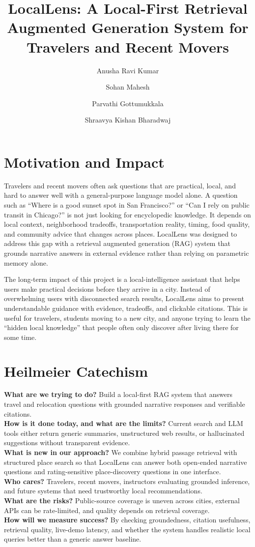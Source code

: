 \documentclass[11pt]{article}
\title{LocalLens: A Local-First Retrieval Augmented Generation System for Travelers and Recent Movers}
\author{
Anusha Ravi Kumar \and
Sohan Mahesh \and
Parvathi Gottumukkala \and
Shraavya Kishan Bharadwaj
}
\date{}
\begin{document}
\maketitle

\section{Motivation and Impact}
Travelers and recent movers often ask questions that are practical, local, and hard to answer well with a general-purpose language model alone. A question such as ``Where is a good sunset spot in San Francisco?'' or ``Can I rely on public transit in Chicago?'' is not just looking for encyclopedic knowledge. It depends on local context, neighborhood tradeoffs, transportation reality, timing, food quality, and community advice that changes across places. LocalLens was designed to address this gap with a retrieval augmented generation (RAG) system that grounds narrative answers in external evidence rather than relying on parametric memory alone.

The long-term impact of this project is a local-intelligence assistant that helps users make practical decisions before they arrive in a city. Instead of overwhelming users with disconnected search results, LocalLens aims to present understandable guidance with evidence, tradeoffs, and clickable citations. This is useful for travelers, students moving to a new city, and anyone trying to learn the ``hidden local knowledge'' that people often only discover after living there for some time.

\section{Heilmeier Catechism}
\textbf{What are we trying to do?} Build a local-first RAG system that answers travel and relocation questions with grounded narrative responses and verifiable citations.\\
\textbf{How is it done today, and what are the limits?} Current search and LLM tools either return generic summaries, unstructured web results, or hallucinated suggestions without transparent evidence.\\
\textbf{What is new in our approach?} We combine hybrid passage retrieval with structured place search so that LocalLens can answer both open-ended narrative questions and rating-sensitive place-discovery questions in one interface.\\
\textbf{Who cares?} Travelers, recent movers, instructors evaluating grounded inference, and future systems that need trustworthy local recommendations.\\
\textbf{What are the risks?} Public-source coverage is uneven across cities, external APIs can be rate-limited, and quality depends on retrieval coverage.\\
\textbf{How will we measure success?} By checking groundedness, citation usefulness, retrieval quality, live-demo latency, and whether the system handles realistic local queries better than a generic answer baseline.
\end{document}
